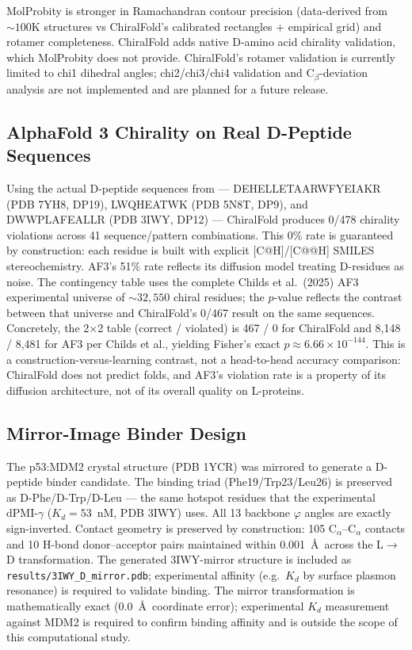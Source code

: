 \documentclass[11pt]{article}
\begin{document}
MolProbity is stronger in Ramachandran contour precision (data-derived from ${\sim}100$K structures vs ChiralFold's calibrated rectangles + empirical grid) and rotamer completeness. ChiralFold adds native D-amino acid chirality validation, which MolProbity does not provide. ChiralFold's rotamer validation is currently limited to chi1 dihedral angles; chi2/chi3/chi4 validation and C$_\beta$-deviation analysis are not implemented and are planned for a future release.

\subsection{AlphaFold 3 Chirality on Real D-Peptide Sequences}

Using the actual D-peptide sequences from \citet{childs2025} --- DEHELLETAARWFYEIAKR (PDB 7YH8, DP19), LWQHEATWK (PDB 5N8T, DP9), and DWWPLAFEALLR (PDB 3IWY, DP12) --- ChiralFold produces 0/478 chirality violations across 41 sequence/pattern combinations. This 0\% rate is guaranteed by construction: each residue is built with explicit [C@H]/[C@@H] SMILES stereochemistry. AF3's 51\% rate reflects its diffusion model treating D-residues as noise. The contingency table uses the complete Childs et al.\ (2025) AF3 experimental universe of ${\sim}32{,}550$ chiral residues; the $p$-value reflects the contrast between that universe and ChiralFold's 0/467 result on the same sequences. Concretely, the 2$\times$2 table (correct / violated) is 467 / 0 for ChiralFold and 8{,}148 / 8{,}481 for AF3 per Childs et al., yielding Fisher's exact $p \approx 6.66 \times 10^{-144}$. This is a construction-versus-learning contrast, not a head-to-head accuracy comparison: ChiralFold does not predict folds, and AF3's violation rate is a property of its diffusion architecture, not of its overall quality on L-proteins.

\subsection{Mirror-Image Binder Design}

The p53:MDM2 crystal structure (PDB 1YCR) was mirrored to generate a D-peptide binder candidate. The binding triad (Phe19/Trp23/Leu26) is preserved as D-Phe/D-Trp/D-Leu --- the same hotspot residues that the experimental dPMI-$\gamma$ ($K_d=53$~nM, PDB 3IWY) uses. All 13 backbone $\varphi$ angles are exactly sign-inverted. Contact geometry is preserved by construction: 105 C$_\alpha$--C$_\alpha$ contacts and 10 H-bond donor--acceptor pairs maintained within 0.001~\AA\ across the L$\to$D transformation. The generated 3IWY-mirror structure is included as \texttt{results/3IWY\_D\_mirror.pdb}; experimental affinity (e.g.\ $K_d$ by surface plasmon resonance) is required to validate binding. The mirror transformation is mathematically exact (0.0~\AA\ coordinate error); experimental $K_d$ measurement against MDM2 is required to confirm binding affinity and is outside the scope of this computational study.
\end{document}
